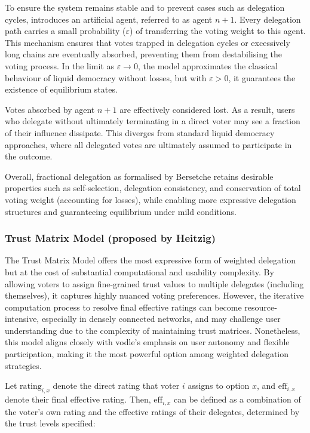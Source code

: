 To ensure the system remains stable and to prevent cases such as delegation cycles, \citeauthor{bersetche2024} introduces an artificial agent, referred to as agent \(n+1\). Every delegation path carries a small probability (\(\varepsilon\)) of transferring the voting weight to this agent. This mechanism ensures that votes trapped in delegation cycles or excessively long chains are eventually absorbed, preventing them from destabilising the voting process. In the limit as \(\varepsilon \to 0\), the model approximates the classical behaviour of liquid democracy without losses, but with \(\varepsilon > 0\), it guarantees the existence of equilibrium states.

Votes absorbed by agent \(n+1\) are effectively considered lost. As a result, users who delegate without ultimately terminating in a direct voter may see a fraction of their influence dissipate. This diverges from standard liquid democracy approaches, where all delegated votes are ultimately assumed to participate in the outcome.

Overall, fractional delegation as formalised by Bersetche retains desirable properties such as self-selection, delegation consistency, and conservation of total voting weight (accounting for losses), while enabling more expressive delegation structures and guaranteeing equilibrium under mild conditions.


\subsubsection*{Trust Matrix Model (proposed by Heitzig)}

The Trust Matrix Model offers the most expressive form of weighted delegation but at the cost of substantial computational and usability complexity. By allowing voters to assign fine-grained trust values to multiple delegates (including themselves), it captures highly nuanced voting preferences. However, the iterative computation process to resolve final effective ratings can become resource-intensive, especially in densely connected networks, and may challenge user understanding due to the complexity of maintaining trust matrices. Nonetheless, this model aligns closely with vodle's emphasis on user autonomy and flexible participation, making it the most powerful option among weighted delegation strategies.

Let \( \text{rating}_{i,x} \) denote the direct rating that voter \( i \) assigns to option \( x \), and \( \text{eff}_{i,x} \) denote their final effective rating. Then, \( \text{eff}_{i,x} \) can be defined as a combination of the voter's own rating and the effective ratings of their delegates, determined by the trust levels specified:

